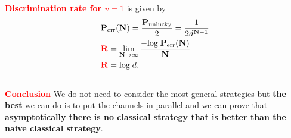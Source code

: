 \documentclass[a4paper,11pt]{article}
\begin{document}
\noindent\textbf{\textcolor{red}{Discrimination rate for $v=1$}} is given by 
\begin{align}
	&\mathbf{P}_\text{err}(\mathbf{N})=\frac{\mathbf{P}_\text{unlucky}}{2}=\frac{1}{2d^{\mathbf{N}-1}}\nonumber\\
	& \mathbf{\textcolor{red}{R}} = \lim_{\mathbf{N}\rightarrow\infty}\frac{-\text{log}\;\mathbf{P}_\text{err}(\mathbf{N})}{\mathbf{N}}\nonumber\\
	& \mathbf{\textcolor{red}{R}}=\text{log}\;d.
\end{align} 
\\

\noindent\textbf{\textcolor{red}{Conclusion}} We do not need to consider the most general strategies but \textbf{the best} we can do is to put the channels in parallel and we can prove that \textbf{asymptotically there is no classical strategy that is better than the naive classical strategy}.
\end{document}
